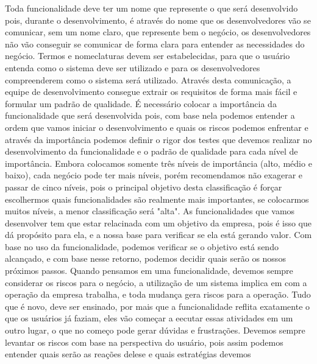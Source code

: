       Toda funcionalidade deve ter um nome que represente o que será desenvolvido
      pois, durante o desenvolvimento, é através do nome que os desenvolvedores
      vão se comunicar, sem um nome claro, que represente bem o negócio, os
      desenvolvedores não vão conseguir se comunicar de forma clara para entender
      as necessidades do negócio. Termos e nomeclaturas devem ser estabelecidas,
      para que o usuário entenda como o sistema deve ser utilizado e para os
      desenvolvedores compreenderem como o sistema será utilizado. Através desta
      comunicação, a equipe de desenvolvimento consegue extrair os requisitos de forma
      mais fácil e formular um padrão de qualidade. \newline
      É necessário colocar a importância da funcionalidade que será desenvolvida pois,
      com base nela podemos entender a ordem que vamos iniciar o desenvolvimento
      e quais os riscos podemos enfrentar e através da importância podemos definir
      o rigor dos testes que devemos realizar no desenvolvimento da funcionalidade
      e o padrão de qualidade para cada nível de importância. Embora colocamos
      somente três níveis de importância (alto, médio e baixo), cada negócio pode
      ter mais níveis, porém recomendamos não exagerar e passar de cinco níveis,
      pois o principal objetivo desta classificação é forçar escolhermos quais
      funcionalidades são realmente mais importantes, se colocarmos muitos níveis,
      a menor classificação será "alta". \newline
      As funcionalidades que vamos desenvolver tem que estar relacinada com um
      objetivo da empresa, pois é isso que dá propósito para ela, e a nossa base
      para verificar se ela está gerando valor. Com base no uso da funcionalidade,
      podemos verificar se o objetivo está sendo alcançado, e com base nesse
      retorno, podemos decidir quais serão os nossos próximos passos. \newline
      Quando pensamos em uma funcionalidade, devemos sempre considerar os riscos
      para o negócio, a utilização de um sistema implica em com a operação da
      empresa trabalha, e toda mudança gera riscos para a operação. Tudo que é
      novo, deve ser ensinado, por mais que a funcionalidade reflita exatamente o
      que os usuários já faziam, eles vão começar a eecutar essas atividades em
      um outro lugar, o que no começo pode gerar dúvidas e frustrações. Devemos
      sempre levantar os riscos com base na perspectiva do usuário, pois assim
      podemos entender quais serão as reações delese e quais estratégias devemos
